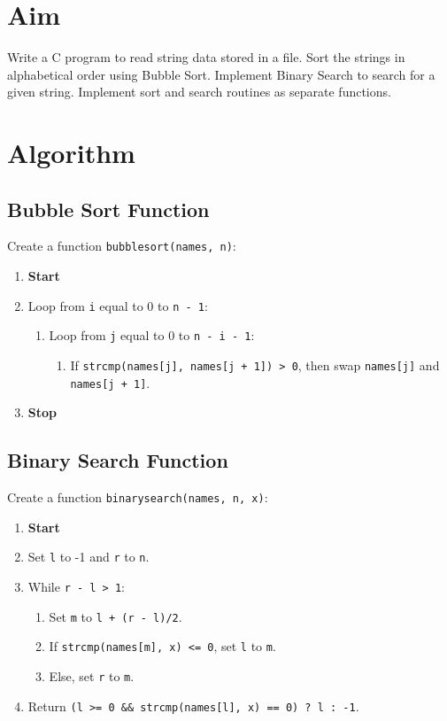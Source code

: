 
\section{Aim}
Write a C program to read string data stored in a file. Sort the strings in alphabetical order
using Bubble Sort. Implement Binary Search to search for a given string. Implement sort and
search routines as separate functions.

\section{Algorithm}
 {\selectfont

  \subsection{Bubble Sort Function}
  Create a function \texttt{bubblesort(names, n)}:
  \begin{enumerate}[label=\arabic*:,left=0pt]
    \item \textbf{Start}
    \item Loop from \texttt{i} equal to 0 to \texttt{n - 1}:
          \begin{enumerate}[label=2.\arabic*:, start=1]
            \item Loop from \texttt{j} equal to 0 to \texttt{n - i - 1}:
                  \begin{enumerate}[label=2.1.\arabic*:, start=1]
                    \item If \texttt{strcmp(names[j], names[j + 1]) > 0}, then swap \texttt{names[j]} and \texttt{names[j + 1]}.
                  \end{enumerate}
          \end{enumerate}
    \item \textbf{Stop}
  \end{enumerate}

  \subsection{Binary Search Function}
  Create a function \texttt{binarysearch(names, n, x)}:
  \begin{enumerate}[label=\arabic*:,left=0pt]
    \item \textbf{Start}
    \item Set \texttt{l} to -1 and \texttt{r} to \texttt{n}.
    \item While \texttt{r - l > 1}:
          \begin{enumerate}[label=2.\arabic*:, start=1]
            \item Set \texttt{m} to \texttt{l + (r - l)/2}.
            \item If \texttt{strcmp(names[m], x) <= 0}, set \texttt{l} to \texttt{m}.
            \item Else, set \texttt{r} to \texttt{m}.
          \end{enumerate}
    \item Return \texttt{(l >= 0 \&\& strcmp(names[l], x) == 0) ? l : -1}.


\end{enumerate}}
